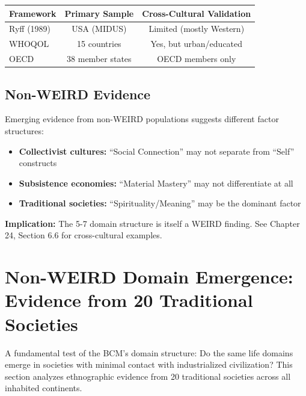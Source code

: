 \begin{center}
\begin{tabular}{@{}lcc@{}}
\toprule
\textbf{Framework} & \textbf{Primary Sample} & \textbf{Cross-Cultural Validation} \\
\midrule
Ryff (1989) & USA (MIDUS) & Limited (mostly Western) \\
WHOQOL & 15 countries & Yes, but urban/educated \\
OECD & 38 member states & OECD members only \\
\bottomrule
\end{tabular}
\end{center}

\subsection{Non-WEIRD Evidence}

Emerging evidence from non-WEIRD populations suggests different factor structures:

\begin{itemize}[nosep]
\item \textbf{Collectivist cultures:} ``Social Connection'' may not separate from ``Self'' constructs
\item \textbf{Subsistence economies:} ``Material Mastery'' may not differentiate at all
\item \textbf{Traditional societies:} ``Spirituality/Meaning'' may be the dominant factor
\end{itemize}

\textbf{Implication:} The 5-7 domain structure is itself a WEIRD finding. See Chapter 24, Section 6.6 for cross-cultural examples.


\section{Non-WEIRD Domain Emergence: Evidence from 20 Traditional Societies}
\label{sec:bj-traditional}

A fundamental test of the BCM's domain structure: Do the same life domains emerge in societies with minimal contact with industrialized civilization? This section analyzes ethnographic evidence from 20 traditional societies across all inhabited continents.

